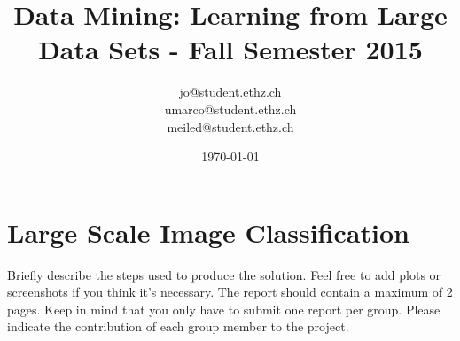 \documentclass[a4paper, 11pt]{article}
\title{Data Mining: Learning from Large Data Sets - Fall Semester 2015}
\author{jo@student.ethz.ch\\ umarco@student.ethz.ch\\ meiled@student.ethz.ch\\}
\date{\today}
\begin{document}
\maketitle

\section*{Large Scale Image Classification}
Briefly describe the steps used to produce the solution. Feel free to add plots or screenshots if you think it's necessary. The report should contain a maximum of 2 pages.
Keep in mind that you only have to submit one report per group. Please indicate the contribution of each group member to the project.
\end{document}
